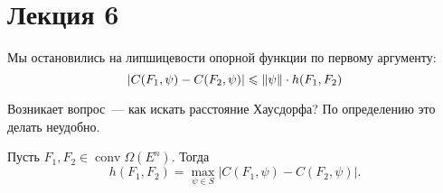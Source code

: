 \section{Лекция 6}

Мы остановились на липшицевости опорной функции по первому аргументу:
\begin{equation*}
    \left| C(F_1, \psi) - C(F_2, \psi) \right| \leqslant \lVert \psi \rVert \cdot h(F_1, F_2)
\end{equation*}

Возникает вопрос~--- как искать расстояние Хаусдорфа?
По определению это делать неудобно.

\begin{thm*}[Свойство 16]
    Пусть $F_1, F_2 \in \operatorname{conv}\Omega(E^{n})$.
    Тогда
    \begin{equation*}
        h(F_1, F_2) = \max\limits_{\psi \in S} \left| C(F_1, \psi) - C(F_2, \psi) \right|.
    \end{equation*}
\end{thm*}

